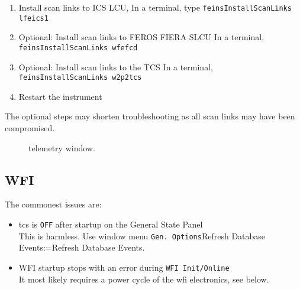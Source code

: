 \documentclass[11pt,fleqn,a4paper]{book}
\makeatletter
\def\menu#1#2{\texttt{#1}\ifx{}#2\else\@for\@x:=#2\do{$\rightarrow$\texttt{\@x}}\fi}
\def\wmenu#1#2{window menu \menu{#1}{#2}}
\makeatother
\begin{document}
\label{proc:ferosscanlinks}
\begin{enumerate}
    \item Install scan links to ICS LCU,
          In a terminal, type \texttt{feinsInstallScanLinks lfeics1}
    \item Optional: Install scan links to FEROS FIERA SLCU
          In a terminal, \texttt{feinsInstallScanLinks wfefcd}
    \item Optional: Install scan links to the TCS
          In a terminal, \texttt{feinsInstallScanLinks w2p2tcs}
    \item Restart the instrument
\end{enumerate}

The optional steps may shorten troubleshooting as all scan links may have been compromised.


\begin{figure}[t!]
\begin{minipage}{0.48\linewidth}
\end{minipage}
\hspace{0.02\linewidth}
\begin{minipage}{0.48\linewidth}
\end{minipage}
\caption[Telemetry window]{\Gls{telemetry} window.}
\end{figure}


\subsection{WFI}

The commonest issues are:
\begin{itemize}
  \item \gls{tcs} is \texttt{OFF} after startup on the \gls{General State} Panel\\
   This is harmless. Use \wmenu{Gen. Options}{Refresh Database Events}.
  \item WFI startup stops with an error during \texttt{WFI Init/Online}\\
       It most likely requires a \gls{power cycle} of the \gls{wfi} electronics, see below.
\end{itemize}
\end{document}
